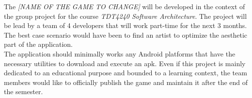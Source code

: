 The \textit{[NAME OF THE GAME TO CHANGE]} will be developed in the context of the group project for the course \textit{TDT4240 Software Architecture}. The project will be lead by a team of 4 developers that will work part-time for the next 3 months. The best case scenario would have been to find an artist to optimize the aesthetic part of the application. \\

The application should minimally works any Android platforms that have the necessary utilities to download and execute an \gls{apk}. Even if this project is mainly dedicated to an educational purpose and bounded to a learning context, the team members would like to officially publish the game and maintain it after the end of the semester.   
